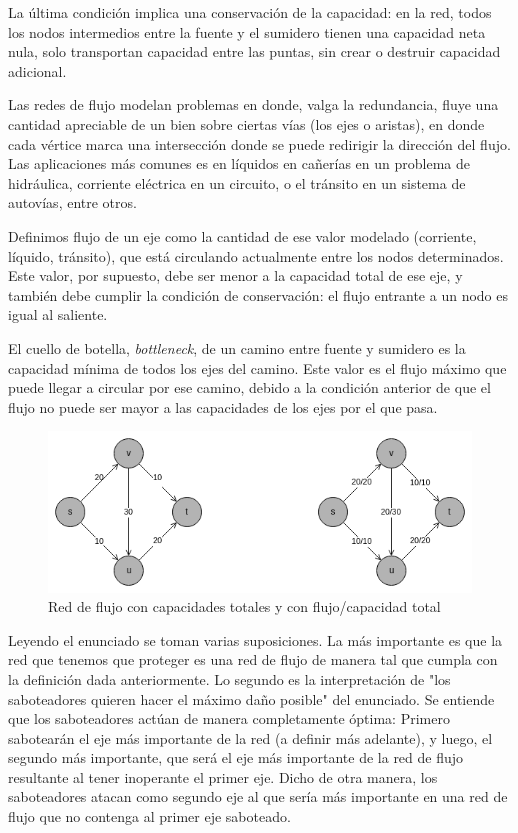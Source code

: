 \documentclass{article}
\begin{document}
La última condición implica una conservación de la capacidad: en la red, todos los nodos intermedios entre la fuente y el sumidero tienen una capacidad neta nula, solo transportan capacidad entre las puntas, sin crear o destruir capacidad adicional.

Las redes de flujo modelan problemas en donde, valga la redundancia, fluye una cantidad apreciable de un bien sobre ciertas vías (los ejes o aristas), en donde cada vértice marca una intersección donde se puede redirigir la dirección del flujo. Las aplicaciones más comunes es en líquidos en cañerías en un problema de hidráulica, corriente eléctrica en un circuito, o el tránsito en un sistema de autovías, entre otros.
 
Definimos flujo de un eje como la cantidad de ese valor modelado (corriente, líquido, tránsito), que está circulando actualmente entre los nodos determinados. Este valor, por supuesto, debe ser menor a la capacidad total de ese eje, y también debe cumplir la condición de conservación: el flujo entrante a un nodo es igual al saliente.

El cuello de botella, \textit{bottleneck}, de un camino entre fuente y sumidero es la capacidad mínima de todos los ejes del camino. Este valor es el flujo máximo que puede llegar a circular por ese camino, debido a la condición anterior de que el flujo no puede ser mayor a las capacidades de los ejes por el que pasa.

\begin{figure}[H]
    \centering
    \includegraphics[scale=0.5]{res/flow_network.png}
    \caption{Red de flujo con capacidades totales y con flujo/capacidad total}
\end{figure}

Leyendo el enunciado se toman varias suposiciones. La más importante es que la red que tenemos que proteger es una red de flujo de manera tal que cumpla con la definición dada anteriormente. Lo segundo es la interpretación de "los saboteadores quieren hacer el máximo daño posible" del enunciado. Se entiende que los saboteadores actúan de manera completamente óptima: Primero sabotearán el eje más importante de la red (a definir más adelante), y luego, el segundo más importante, que será el eje más importante de la red de flujo resultante al tener inoperante el primer eje. Dicho de otra manera, los saboteadores atacan como segundo eje al que sería más importante en una red de flujo que no contenga al primer eje saboteado.
\end{document}
